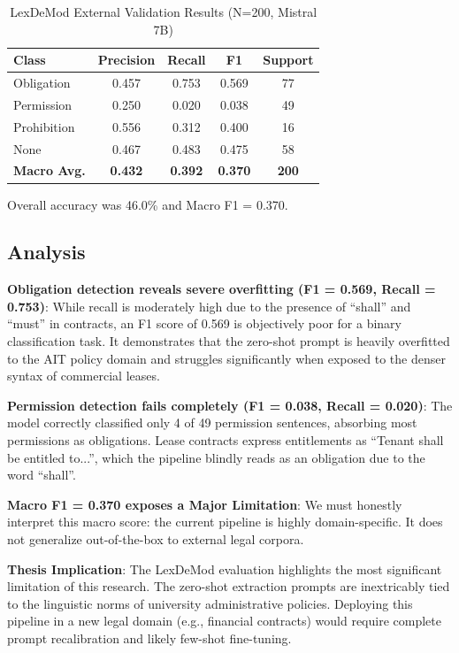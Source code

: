 \begin{table}[htbp]
\centering
\caption{LexDeMod External Validation Results (N=200, Mistral 7B)}
\label{tab:lexdemod-results}
\begin{tabular}{lcccc}
\toprule
\textbf{Class} & \textbf{Precision} & \textbf{Recall} & \textbf{F1} & \textbf{Support} \\
\midrule
Obligation  & 0.457 & 0.753 & 0.569 & 77 \\
Permission  & 0.250 & 0.020 & 0.038 & 49 \\
Prohibition & 0.556 & 0.312 & 0.400 & 16 \\
None        & 0.467 & 0.483 & 0.475 & 58 \\
\midrule
\textbf{Macro Avg.} & \textbf{0.432} & \textbf{0.392} & \textbf{0.370} & \textbf{200} \\
\bottomrule
\end{tabular}
\end{table}

Overall accuracy was 46.0\% and Macro F1 = 0.370.

\subsection{Analysis}

\textbf{Obligation detection reveals severe overfitting (F1 = 0.569, Recall = 0.753)}: While recall is moderately high due to the presence of ``shall'' and ``must'' in contracts, an F1 score of 0.569 is objectively poor for a binary classification task. It demonstrates that the zero-shot prompt is heavily overfitted to the AIT policy domain and struggles significantly when exposed to the denser syntax of commercial leases.

\textbf{Permission detection fails completely (F1 = 0.038, Recall = 0.020)}: The model correctly classified only 4 of 49 permission sentences, absorbing most permissions as obligations. Lease contracts express entitlements as ``Tenant shall be entitled to...'', which the pipeline blindly reads as an obligation due to the word ``shall''. 

\textbf{Macro F1 = 0.370 exposes a Major Limitation}: We must honestly interpret this macro score: the current pipeline is highly domain-specific. It does not generalize out-of-the-box to external legal corpora. 

\textbf{Thesis Implication}: The LexDeMod evaluation highlights the most significant limitation of this research. The zero-shot extraction prompts are inextricably tied to the linguistic norms of university administrative policies. Deploying this pipeline in a new legal domain (e.g., financial contracts) would require complete prompt recalibration and likely few-shot fine-tuning.


